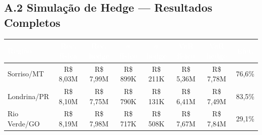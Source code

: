 \documentclass[11pt,a4paper]{article}
\renewcommand{\arraystretch}{1.15}
\begin{document}
\subsection*{A.2 Simulação de Hedge --- Resultados Completos}
\smallskip
\renewcommand{\arraystretch}{1.2}
\begin{tabular}{lccccccc}
\toprule
\rowcolor{wolf_blue}\textcolor{white}{\textbf{Região}} &
\textcolor{white}{\textbf{Rec. física}} &
\textcolor{white}{\textbf{Rec. hedge}} &
\textcolor{white}{$\bm{\sigma}$ físico} &
\textcolor{white}{$\bm{\sigma}$ hedge} &
\textcolor{white}{\textbf{VaR físico}} &
\textcolor{white}{\textbf{VaR hedge}} &
\textcolor{white}{\textbf{Efet.}} \\
\midrule
Sorriso/MT   & R\$ 8,03M & R\$ 7,99M & R\$ 899K & R\$ 211K & R\$ 5,36M & R\$ 7,78M & 76,6\% \\
Londrina/PR  & R\$ 8,10M & R\$ 7,75M & R\$ 790K & R\$ 131K & R\$ 6,41M & R\$ 7,49M & 83,5\% \\
Rio Verde/GO & R\$ 8,19M & R\$ 7,98M & R\$ 717K & R\$ 508K & R\$ 7,67M & R\$ 7,84M & 29,1\% \\
\bottomrule
\end{tabular}
\end{document}

